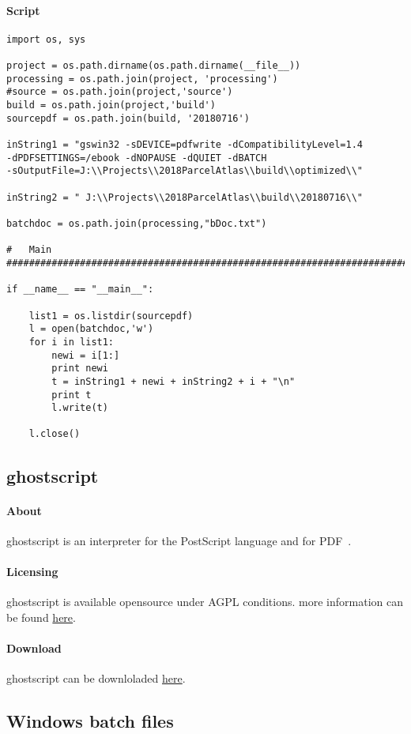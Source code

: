 \documentclass[class=article , crop=false, titlepage, twoside, multi={itemize, figure, verbatim}, float=false]{standalone}
\begin{document}
\paragraph{Script}
\begin{verbatim}
import os, sys

project = os.path.dirname(os.path.dirname(__file__))
processing = os.path.join(project, 'processing')
#source = os.path.join(project,'source')
build = os.path.join(project,'build')
sourcepdf = os.path.join(build, '20180716')

inString1 = "gswin32 -sDEVICE=pdfwrite -dCompatibilityLevel=1.4 
-dPDFSETTINGS=/ebook -dNOPAUSE -dQUIET -dBATCH 
-sOutputFile=J:\\Projects\\2018ParcelAtlas\\build\\optimized\\"

inString2 = " J:\\Projects\\2018ParcelAtlas\\build\\20180716\\"

batchdoc = os.path.join(processing,"bDoc.txt")

#   Main
################################################################################

if __name__ == "__main__":

    list1 = os.listdir(sourcepdf)
    l = open(batchdoc,'w')
    for i in list1:
        newi = i[1:]
        print newi
        t = inString1 + newi + inString2 + i + "\n"
        print t
        l.write(t)

    l.close()

\end{verbatim}

\subsection{ghostscript}

\paragraph{About}
ghostscript is an interpreter for the PostScript language and for PDF~\cite{ghostscript1}.
\paragraph{Licensing}
ghostscript is available opensource under AGPL conditions.  more information can be found \href{https://www.ghostscript.com/license.html}{here}.
\paragraph{Download}
ghostscript can be downloladed \href{https://www.ghostscript.com/download/gsdnld.html}{here}.


\subsection{Windows batch files}
\end{document}
